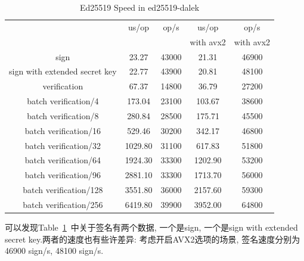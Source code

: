 \begin{table}[h]
\centering
\caption{Ed25519 Speed in ed25519-dalek}\label{tbl-ed25519-dalek}
\begin{tabular}{|c|c|c|c|c|}
\hline
                                    &       us/op   &  op/s      &     us/op        & op/s \\ 
                             	  &                  &               &   with avx2 & with avx2 \\\hline
sign				  &  23.27 & 43000 & 21.31 & 46900\\\hline
sign with extended secret key &  22.77 & 43900 & 20.81 & 48100\\ \hline
verification                  & 67.37 & 14800 & 36.79 & 27200\\ \hline
batch verification/4     & 173.04 & 23100 & 103.67 & 38600\\\hline
batch verification/8     & 280.84 & 28500 & 175.71 & 45500\\\hline
batch verification/16   & 529.46 & 30200 & 342.17 & 46800\\\hline
batch verification/32   & 1029.80 & 31100 & 617.83 & 51800\\\hline
batch verification/64   & 1924.30 & 33300 & 1202.90 & 53200\\\hline
batch verification/96   & 2881.10 & 33300 & 1713.70 & 56000\\\hline
batch verification/128 & 3551.80 & 36000 & 2157.60 & 59300\\\hline
batch verification/256 & 6419.80 & 39900 & 3952.00 & 64800\\\hline

\end{tabular}
\end{table}

可以发现Table~\ref{tbl-ed25519-dalek}~中关于签名有两个数据, 一个是sign, 
一个是sign with extended secret key.两者的速度也有些许差异:
考虑开启AVX2选项的场景, 签名速度分别为46900 sign/s, 48100 sign/s.
